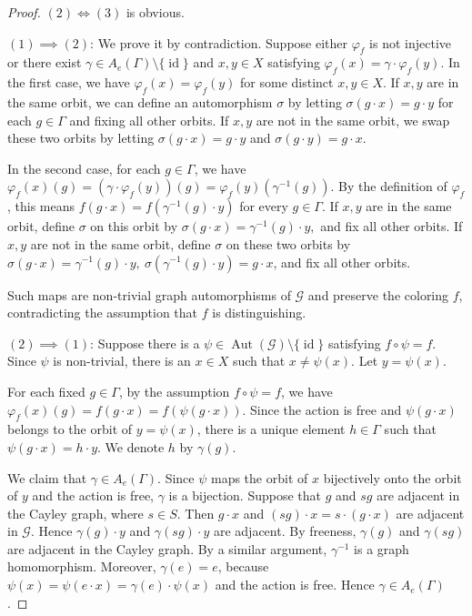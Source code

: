 \documentclass[11pt, reqno, a4paper]{amsart}
\theoremstyle{plain}
\theoremstyle{definition}
\theoremstyle{remark}
\newcommand{\Aut}{\operatorname{Aut}}
\newcommand{\id}{\operatorname{id}}
\begin{document}
\begin{proof}
$(2) \iff (3)$ is obvious.

$(1)\implies (2)$: We prove it by  contradiction. Suppose either $\varphi_f$ is not injective  or there exist $\gamma \in A_e(\Gamma)\setminus\{\id\}$ and $x,y \in X$ satisfying $\varphi_f(x) = \gamma\cdot\varphi_f(y)$. In the first case, 
we have $\varphi_f(x) =\varphi_f(y)$ for some distinct $x, y \in X$. If $x,y$ are in the same orbit, we can define an automorphism $\sigma$ by letting $\sigma (g\cdot x)=g\cdot y$ for each $g\in \Gamma$ and fixing all other orbits. If $x,y$ are not in the same orbit, we swap these two orbits by letting $\sigma (g\cdot x)=g\cdot y$ and $\sigma (g\cdot y)=g\cdot x$.

In the second case, for each $g\in \Gamma$, we have
$\varphi_f(x)(g)=(\gamma\cdot\varphi_f(y))(g)=\varphi_f(y)(\gamma^{-1}(g)).$
By the definition of $\varphi_f$, this means $f(g\cdot x)=f(\gamma^{-1}(g)\cdot y)$ for every $g\in\Gamma$. If $x,y$ are in the same orbit, define $\sigma$ on this orbit by
$\sigma(g\cdot x)=\gamma^{-1}(g)\cdot y,$
and fix all other orbits. If $x,y$ are not in the same orbit, define $\sigma$ on these two orbits by
$\sigma(g\cdot x)=\gamma^{-1}(g)\cdot y,\ \sigma(\gamma^{-1}(g)\cdot y)=g\cdot x$,
and fix all other orbits.

Such maps are non-trivial graph automorphisms of $\mathcal{G}$ and preserve the coloring $f$, contradicting the assumption that $f$ is distinguishing.

$(2)\implies(1)$: Suppose there is a $\psi\in \Aut(\mathcal G)\setminus\{\id\}$ satisfying $f\circ\psi=f$. Since $\psi$ is non-trivial, there is an $x\in X$ such that $x\ne\psi(x)$. Let $y=\psi(x)$.

For each fixed $g\in\Gamma$, by the assumption $f\circ\psi=f$, we have $\varphi_f(x)(g)=f(g\cdot x)=f(\psi(g\cdot x))$. Since the action is free and $\psi(g\cdot x)$ belongs to the orbit of $y=\psi(x)$, there is a unique element $h\in\Gamma$ such that $\psi(g\cdot x)=h\cdot y$. We denote $h$ by $\gamma(g)$.

We claim that $\gamma\in A_e(\Gamma)$. Since $\psi$ maps the orbit of $x$ bijectively onto the orbit of $y$ and the action is free, $\gamma$ is a bijection. Suppose that $g$ and $sg$ are adjacent in the  Cayley graph, where $s\in S$. Then $g\cdot x$ and $(sg)\cdot x=s\cdot(g\cdot x)$ are adjacent in $\mathcal G$. Hence $\gamma(g)\cdot y$ and $\gamma(sg)\cdot y$ are adjacent. By freeness, $\gamma(g)$ and $\gamma(sg)$ are adjacent in the  Cayley graph. By a similar argument, $\gamma^{-1}$ is a graph homomorphism. Moreover, $\gamma(e)=e$, because $\psi(x)=\psi(e\cdot x)=\gamma(e)\cdot\psi(x)$ and the action is free. Hence $\gamma\in A_e(\Gamma)$.


\end{proof}
\end{document}
